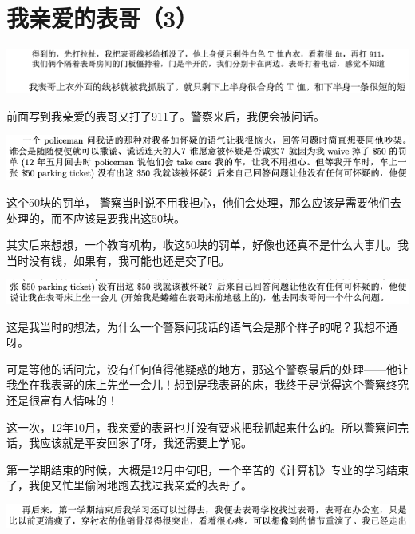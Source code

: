 \documentclass[9pt, b5paper]{article}
\begin{document}
\section{我亲爱的表哥（3）}
\label{sec:org973ae08}

\begin{center}
\includegraphics[width=.9\linewidth]{./pic/backups_plans_20210506_094808.png}
\end{center}

前面写到我亲爱的表哥又打了911了。警察来后，我便会被问话。

\begin{center}
\includegraphics[width=.9\linewidth]{./pic/backups_plans_20210505_203728.png}
\end{center}

这个50块的罚单， 警察当时说不用我担心，他们会处理，那么应该是需要他们去处理的，而不应该是要我出这50块。

其实后来想想，一个教育机构，收这50块的罚单，好像也还真不是什么大事儿。我当时没有钱，如果有，我可能也还是交了吧。 

\begin{center}
\includegraphics[width=.9\linewidth]{./pic/backups_plans_20210505_203929.png}
\end{center}

这是我当时的想法，为什么一个警察问我话的语气会是那个样子的呢？我想不通呀。 

可是等他的话问完，没有任何值得他疑惑的地方，那这个警察最后的处理——他让我坐在我表哥的床上先坐一会儿！想到是我表哥的床，我终于是觉得这个警察终究还是很富有人情味的！

这一次，12年10月，我亲爱的表哥也并没有要求把我抓起来什么的。所以警察问完话，我应该就是平安回家了呀，我还需要上学呢。 

第一学期结束的时候，大概是12月中旬吧，一个辛苦的《计算机》专业的学习结束了，我便又忙里偷闲地跑去找过我亲爱的表哥了。 

\begin{center}
\includegraphics[width=.9\linewidth]{./pic/backups_plans_20210505_204248.png}
\end{center}
\end{document}
